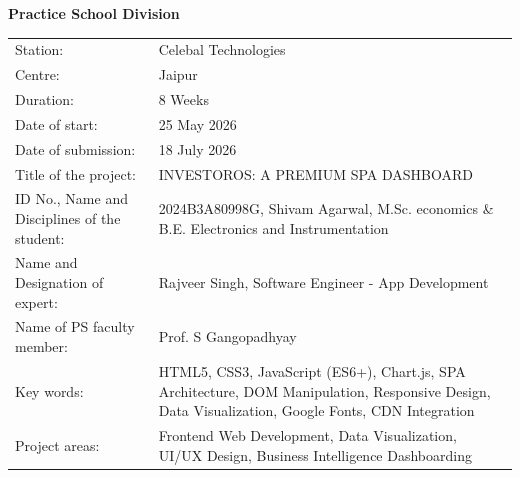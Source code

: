 \documentclass{book}
\begin{document}
    \centerline{\bf Practice School Division}
\vspace*{0.3cm}

\begin{center}
    \begin{tabular}{@{}p{5.5cm} p{9.5cm}@{}}

    Station: & Celebal Technologies \\[0.2cm]

    Centre: & Jaipur \\[0.2cm]

    Duration: & 8 Weeks \\[0.2cm]

    Date of start: & 25 May 2026 \\[0.2cm]

    Date of submission: & 18 July 2026 \\[0.2cm]

    Title of the project: &  INVESTOROS: A PREMIUM SPA DASHBOARD \\[0.2cm]

    ID No., Name and Disciplines of the student: & 2024B3A80998G, Shivam Agarwal, M.Sc. economics \& B.E. Electronics and Instrumentation \\[0.2cm]

    Name and Designation of expert: & Rajveer Singh, Software Engineer - App Development \\[0.2cm]

    Name of PS faculty member: & Prof. S Gangopadhyay \\[0.2cm]

    Key words: & HTML5, CSS3, JavaScript (ES6+), Chart.js, SPA Architecture, DOM Manipulation, Responsive Design, Data Visualization, Google Fonts, CDN Integration \\[0.2cm]

    Project areas: & Frontend Web Development, Data Visualization, UI/UX Design, Business Intelligence Dashboarding \\[0.2cm]


\end{tabular}
\end{center}
\end{document}
